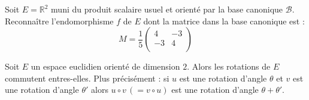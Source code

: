 \documentclass[french,11pt,twoside]{VcCours}
\begin{document}
\medskip

\begin{Exemple}{} Soit $E= \mathbb{R}^2$ muni du produit scalaire usuel et orienté par la base canonique $\mathcal{B}$. Reconnaître l'endomorphisme $f$ de $E$ dont la matrice dans la base canonique est :
$$ M =\dfrac{1}{5} \begin{pmatrix}
4 & -3 \\
-3 & 4\\
\end{pmatrix}$$

\vspace{6cm}
\end{Exemple}

\begin{Proposition}{} Soit $E$ un espace euclidien orienté de dimension $2$. Alors les rotations de $E$ commutent entres-elles. Plus précisément : si $u$ est une rotation d'angle $\theta$ et $v$ est une rotation d'angle $\theta'$ alors $u \circ v \, (= v \circ u)$ est une rotation d'angle $\theta + \theta'$.
\end{Proposition}

\begin{Demonstration}{}
\vspace{3cm}
\end{Demonstration}
\end{document}
